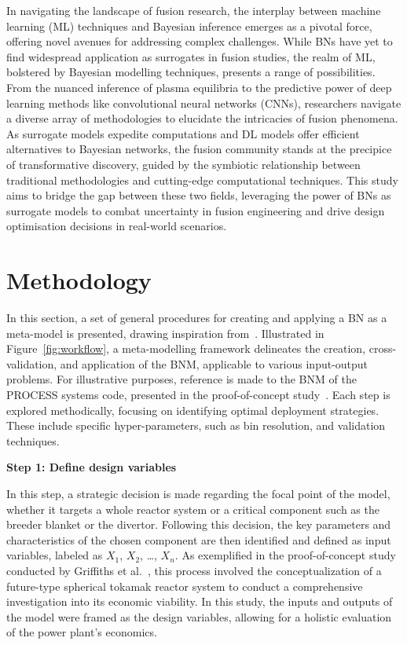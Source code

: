 \documentclass[journal]{IEEEtran}
\begin{document}
In navigating the landscape of fusion research, the interplay between machine learning (ML) techniques and Bayesian inference emerges as a pivotal force, offering novel avenues for addressing complex challenges. While BNs have yet to find widespread application as surrogates in fusion studies, the realm of ML, bolstered by Bayesian modelling techniques, presents a range of possibilities. From the nuanced inference of plasma equilibria to the predictive power of deep learning methods like convolutional neural networks (CNNs), researchers navigate a diverse array of methodologies to elucidate the intricacies of fusion phenomena. As surrogate models expedite computations and DL models offer efficient alternatives to Bayesian networks, the fusion community stands at the precipice of transformative discovery, guided by the symbiotic relationship between traditional methodologies and cutting-edge computational techniques. This study aims to bridge the gap between these two fields, leveraging the power of BNs as surrogate models to combat uncertainty in fusion engineering and drive design optimisation decisions in real-world scenarios.

\section{Methodology}\label{sec:methodology}

In this section, a set of general procedures for creating and applying a BN as a meta-model is presented, drawing inspiration from~\cite{Conti2019}. Illustrated in Figure~\ref{fig:workflow}, a meta-modelling framework delineates the creation, cross-validation, and application of the BNM, applicable to various input-output problems. For illustrative purposes, reference is made to the BNM of the PROCESS systems code, presented in the proof-of-concept study~\cite{Griffiths2024}. Each step is explored methodically, focusing on identifying optimal deployment strategies. These include specific hyper-parameters, such as bin resolution, and validation techniques. 

\textbf{Step 1: Define design variables}

In this step, a strategic decision is made regarding the focal point of the model, whether it targets a whole reactor system or a critical component such as the breeder blanket or the divertor. Following this decision, the key parameters and characteristics of the chosen component are then identified and defined as input variables, labeled as $X_1$, $X_2$, \ldots, $X_n$. As exemplified in the proof-of-concept study conducted by Griffiths et al.~\cite{Griffiths2024}, this process involved the conceptualization of a future-type spherical tokamak reactor system to conduct a comprehensive investigation into its economic viability. In this study, the inputs and outputs of the model were framed as the design variables, allowing for a holistic evaluation of the power plant's economics.
\end{document}
